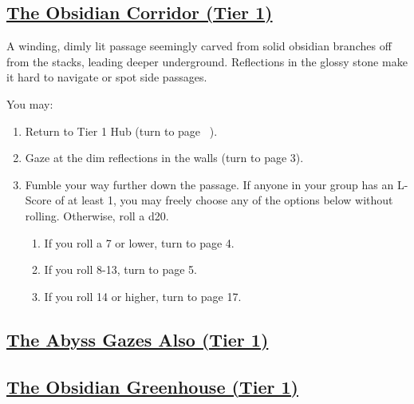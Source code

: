 \documentclass[sheet]{GL2020}
\begin{document}
\clearpage

\begin{center}\section*{\underline{The Obsidian Corridor (Tier 1)}}\end{center}
\label{ObsidianCorridor}

A winding, dimly lit passage seemingly carved from solid obsidian branches off from the stacks, leading deeper underground. Reflections in the glossy stone make it hard to navigate or spot side passages. 

You may:
\begin{enumerate}[A]
	\item Return to Tier 1 Hub (turn to page ~\pageref{TierTwoHub}).
	\item Gaze at the dim reflections in the walls (turn to page 3).
	\item Fumble your way further down the passage. If anyone in your group has an L-Score of at least 1, you may freely choose any of the options below without rolling. Otherwise, roll a d20.
	\begin{enumerate}
		\item If you roll a 7 or lower, turn to page 4.
		\item If you roll 8-13, turn to page 5.
		\item If you roll 14 or higher, turn to page 17.
	\end{enumerate}
\end{enumerate}

\clearpage

\begin{center}\section*{\underline{The Abyss Gazes Also (Tier 1)}}\end{center}
\label{AbyssGazesAlso}

\clearpage

\begin{center}\section*{\underline{The Obsidian Greenhouse (Tier 1)}}\end{center}
\label{ObsidianGreenhouse}

\clearpage
\end{document}
